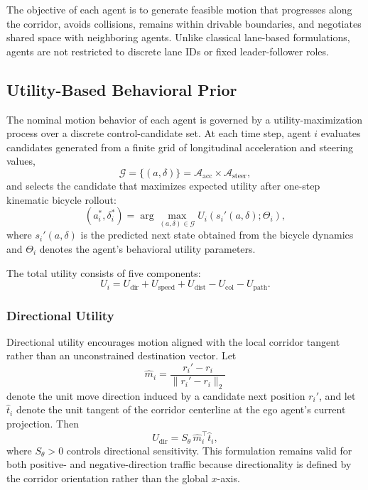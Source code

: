 \documentclass[conference]{IEEEtran}
\begin{document}
The objective of each agent is to generate feasible motion that progresses along the corridor, avoids collisions, remains within drivable boundaries, and negotiates shared space with neighboring agents. Unlike classical lane-based formulations, agents are not restricted to discrete lane IDs or fixed leader-follower roles.

\subsection{Utility-Based Behavioral Prior}
The nominal motion behavior of each agent is governed by a utility-maximization process over a discrete control-candidate set. At each time step, agent $i$ evaluates candidates generated from a finite grid of longitudinal acceleration and steering values,
\begin{equation}
\mathcal{G}
=
\big\{(a,\delta)\big\}
=
\mathcal{A}_{\text{acc}}\times\mathcal{A}_{\text{steer}},
\end{equation}
and selects the candidate that maximizes expected utility after one-step kinematic bicycle rollout:
\begin{equation}
(a_{i}^{*},\delta_{i}^{*})
=
\arg\max_{(a,\delta)\in\mathcal{G}}
U_{i}\!\left(s_{i}'(a,\delta);\Theta_{i}\right),
\end{equation}
where $s_{i}'(a,\delta)$ is the predicted next state obtained from the bicycle dynamics and $\Theta_{i}$ denotes the agent's behavioral utility parameters.

The total utility consists of five components:
\begin{equation}
U_{i}
=
U_{\mathrm{dir}}
+
U_{\mathrm{speed}}
+
U_{\mathrm{dist}}
-
U_{\mathrm{col}}
-
U_{\mathrm{path}}.
\label{eq:utility}
\end{equation}

\subsubsection{Directional Utility}
Directional utility encourages motion aligned with the local corridor tangent rather than an unconstrained destination vector. Let
\begin{equation}
\hat{m}_{i}
=
\frac{r_{i}'-r_{i}}{\|r_{i}'-r_{i}\|_{2}}
\end{equation}
denote the unit move direction induced by a candidate next position $r_{i}'$, and let $\hat{t}_{i}$ denote the unit tangent of the corridor centerline at the ego agent's current projection. Then
\begin{equation}
U_{\mathrm{dir}}
=
S_{\theta}\,
\hat{m}_{i}^{\top}\hat{t}_{i},
\end{equation}
where $S_{\theta}>0$ controls directional sensitivity. This formulation remains valid for both positive- and negative-direction traffic because directionality is defined by the corridor orientation rather than the global $x$-axis.
\end{document}
